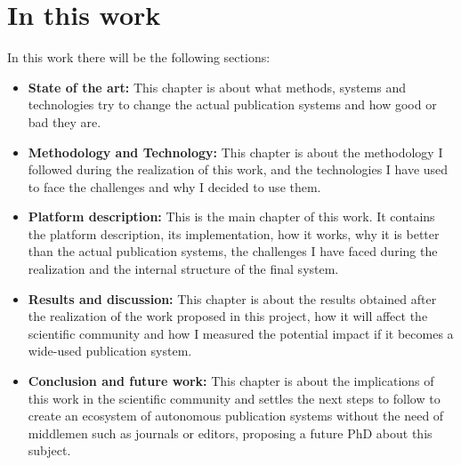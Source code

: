   \section{In this work}
  In this work there will be the following sections:
  \begin{itemize}
  \item \textbf{State of the art:} This chapter is about what methods, systems
    and technologies try to change the actual publication systems and how good
    or bad they are.
  \item \textbf{Methodology and Technology:} This chapter is about the
    methodology I followed during the realization of this work, and the
    technologies I have used to face the challenges and why I decided to use
    them.
  \item \textbf{Platform description:} This is the main chapter of this work. It
    contains the platform description, its implementation, how it works, why it
    is better than the actual publication systems, the challenges I have faced
    during the realization and the internal structure of the final system.
  \item \textbf{Results and discussion:} This chapter is about the results
    obtained after the realization of the work proposed in this project, how it
    will affect the scientific community and how I measured the potential impact
    if it becomes a wide-used publication system.
  \item \textbf{Conclusion and future work:} This chapter is about the
    implications of this work in the scientific community and settles the next
    steps to follow to create an ecosystem of autonomous publication systems
    without the need of middlemen such as journals or editors, proposing a
    future PhD about this subject.
  \end{itemize}


